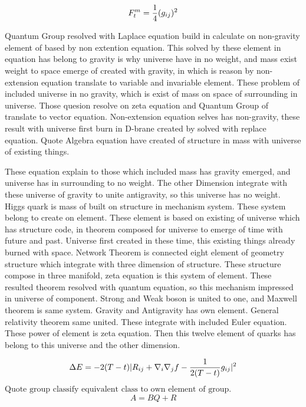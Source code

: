 \documentclass{jsarticle}
\begin{document}
\begin{equation}
  F^m_{t} = {1 \over 4}(g_{ij})^2 
\end{equation}

   Quantum Group resolved with Laplace equation build in calculate on non-gravity element of based by non extention
equation. This solved by these element in equation has belong to gravity is why universe have in no weight,
and mass exist weight to space emerge of created with gravity, in which is reason by non-extension equation 
translate to variable and invariable element. These problem of included universe in no gravity, which is exist of mass
on space of surrounding in universe. Those quesion resolve on zeta equation and Quantum Group of translate to vector
equation. Non-extension equation selves has non-gravity, these result with universe first burn in D-brane created by 
solved with replace equation. Quote Algebra equation have created of structure in mass with universe of existing 
things. 

  These equation explain to those which included mass has gravity emerged, and universe has in surrounding to no
weight. The other Dimension integrate with these universe of gravity to unite antigravity, so this universe has no
weight. Higgs quark is mass of built on structure in mechanism system. These system belong to create on element.
These element is based on existing of universe which has structure code, in theorem composed for universe to emerge
of time with future and past. Universe first created in these time, this existing things already burned with space.
Network Theorem is connected eight element of geometry structure which integrate with three dimension of structure.
These structure compose in three manifold, zeta equation is this system of element. These resulted theorem resolved
with quantum equation, so this mechanism impressed in universe of component. Strong and Weak boson is united to one,
and Maxwell theorem is same system. Gravity and Antigravity has own element. General relativity theorem same united.
These integrate with included Euler equation. These power of element is zeta equation. Then this twelve element of
quarks has belong to this universe and the other dimension.


\begin{equation}
 \Delta E = - 2(T- t)|R_{ij} + \nabla_{i} \nabla_{j} f - 
	{1 \over 2(T - t)}g_{ij}|^2
\end{equation}
$\text{Quote group classify equivalent class to own element of group.}$
\begin{equation}
   A = BQ + R 
\end{equation}
\end{document}
